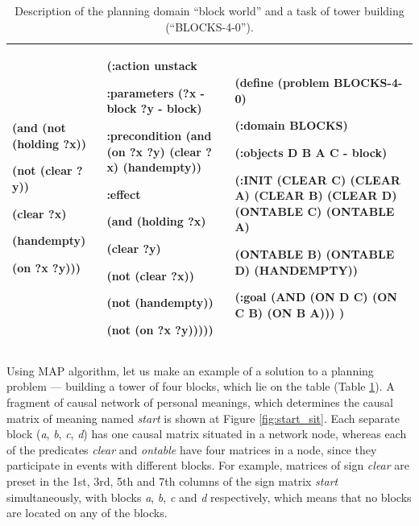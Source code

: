 \documentclass[review]{elsarticle}
\begin{document}
\begin{table}
\begin{tabular}{|p{}|p{}|p{}|}
		(and (not (holding ?x))
		
		(not (clear ?y))
		
		(clear ?x)
		
		(handempty)
		
		(on ?x ?y)))
		&
		(:\textbf{action unstack}
		
		:parameters (?x - block ?y - block)
		
		:precondition (and (on ?x ?y) (clear ?x) (handempty))
		
		:effect
		
		(and (holding ?x)
		
		(clear ?y)
		
		(not (clear ?x))
		
		(not (handempty))
		
		(not (on ?x ?y)))))
		&
		(define (\textbf{problem BLOCKS-4-0})
		
		(:domain BLOCKS)
		
		(:objects D B A C - block)
		
		(:INIT (CLEAR C) (CLEAR A) (CLEAR B) (CLEAR D) (ONTABLE C) (ONTABLE A)
		
		(ONTABLE B) (ONTABLE D) (HANDEMPTY))
		
		(:goal (AND (ON D C) (ON C B) (ON B A)))
		)\\
		\hline
	\end{tabular}
	\caption{Description of the planning domain ``block world'' and a task of tower building (``BLOCKS-4-0'').}
	\label{tab:domain}
\end{table}

Using MAP algorithm, let us make an example of a solution to a planning problem --- building a tower of four blocks, which lie on the table (Table \ref{tab:domain}). A fragment of causal network of personal meanings, which determines the causal matrix of meaning named \textit{start} is shown at Figure \ref{fig:start_sit}. Each separate block (\textit{a}, \textit{b}, \textit{c}, \textit{d}) has one causal matrix situated in a network node, whereas each of the predicates \textit{clear} and \textit{ontable} have four matrices in a node, since they participate in events with different blocks. For example, matrices of sign \textit{clear} are preset in the 1st, 3rd, 5th and 7th columns of the sign matrix \textit{start} simultaneously, with blocks \textit{a}, \textit{b}, \textit{c} and \textit{d} respectively, which means that no blocks are located on any of the blocks.
\end{document}
